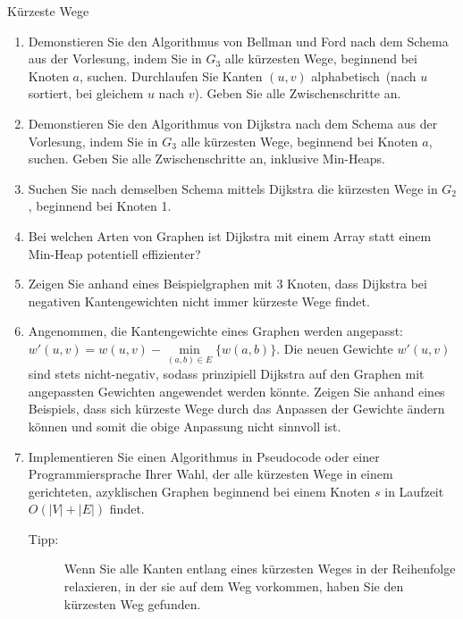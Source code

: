 \documentclass[11pt,a4paper]{article}
\begin{document}
\begin{aufgabe}{3}{Kürzeste Wege}
\begin{figure}[h!]
    \end{figure}
    \FloatBarrier
    \begin{enumerate}[label=\alph*)]
        \item Demonstieren Sie den Algorithmus von Bellman und Ford nach dem Schema aus der Vorlesung, indem Sie in $G_3$ alle kürzesten Wege, beginnend bei Knoten $a$, suchen.
        Durchlaufen Sie Kanten $(u, v)$ alphabetisch~(nach $u$ sortiert, bei gleichem $u$ nach $v$).
        Geben Sie alle Zwischenschritte an.
        \item Demonstieren Sie den Algorithmus von Dijkstra nach dem Schema aus der Vorlesung, indem Sie in $G_3$ alle kürzesten Wege, beginnend bei Knoten $a$, suchen.
        Geben Sie alle Zwischenschritte an, inklusive Min-Heaps.
        \item Suchen Sie nach demselben Schema mittels Dijkstra die kürzesten Wege in $G_2$, beginnend bei Knoten 1.
        \item Bei welchen Arten von Graphen ist Dijkstra mit einem Array statt einem Min-Heap potentiell effizienter?
        \item Zeigen Sie anhand eines Beispielgraphen mit 3 Knoten, dass Dijkstra bei negativen Kantengewichten nicht immer kürzeste Wege findet.
        \item Angenommen, die Kantengewichte eines Graphen werden angepasst: $w'(u, v) = w(u, v) - \min\limits_{(a, b) \in E} \{w(a, b) \}$.
        Die neuen Gewichte $w'(u, v)$ sind stets nicht-negativ, sodass prinzipiell Dijkstra auf den Graphen mit angepassten Gewichten angewendet werden könnte.
        Zeigen Sie anhand eines Beispiels, dass sich kürzeste Wege durch das Anpassen der Gewichte ändern können und somit die obige Anpassung nicht sinnvoll ist.
        \item\label{shortest_paths_dag} \hard Implementieren Sie einen Algorithmus in Pseudocode oder einer Programmiersprache Ihrer Wahl, der alle kürzesten Wege in einem gerichteten, azyklischen Graphen beginnend bei einem Knoten $s$ in Laufzeit $O(|V| + |E|)$ findet.
        \begin{description}
            \item[Tipp:] Wenn Sie alle Kanten entlang eines kürzesten Weges in der Reihenfolge relaxieren, in der sie auf dem Weg vorkommen, haben Sie den kürzesten Weg gefunden.
        \end{description}
    \end{enumerate}
\end{aufgabe}
\end{document}
